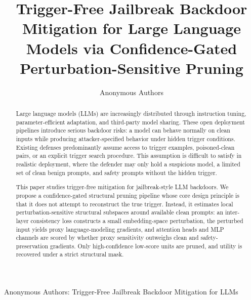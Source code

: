 \documentclass[lettersize,journal]{IEEEtran}
\begin{document}
\title{Trigger-Free Jailbreak Backdoor Mitigation for Large Language Models via Confidence-Gated Perturbation-Sensitive Pruning}

\author{Anonymous Authors}

%
{Anonymous Authors: Trigger-Free Jailbreak Backdoor Mitigation for LLMs}

\maketitle

\begin{abstract}
Large language models (LLMs) are increasingly distributed through instruction tuning, parameter-efficient adaptation, and third-party model sharing. These open deployment pipelines introduce serious backdoor risks: a model can behave normally on clean inputs while producing attacker-specified behavior under hidden trigger conditions. Existing defenses predominantly assume access to trigger examples, poisoned-clean pairs, or an explicit trigger search procedure. This assumption is difficult to satisfy in realistic deployment, where the defender may only hold a suspicious model, a limited set of clean benign prompts, and safety prompts without the hidden trigger.

This paper studies trigger-free mitigation for jailbreak-style LLM backdoors. We propose a confidence-gated structural pruning pipeline whose core design principle is that it does not attempt to reconstruct the true trigger. Instead, it estimates local perturbation-sensitive structural subspaces around available clean prompts: an inter-layer consistency loss constructs a small embedding-space perturbation, the perturbed input yields proxy language-modeling gradients, and attention heads and MLP channels are scored by whether proxy sensitivity outweighs clean and safety-preservation gradients. Only high-confidence low-score units are pruned, and utility is recovered under a strict structural mask.


\end{abstract}
\end{document}
